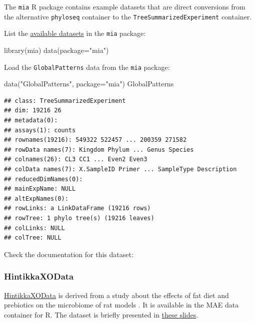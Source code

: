 \documentclass[
]{book}
\newenvironment{Shaded}{\begin{snugshade}}{\end{snugshade}}
\newcommand{\AttributeTok}[1]{\textcolor[rgb]{0.77,0.63,0.00}{#1}}
\newcommand{\FunctionTok}[1]{\textcolor[rgb]{0.00,0.00,0.00}{#1}}
\newcommand{\NormalTok}[1]{#1}
\newcommand{\StringTok}[1]{\textcolor[rgb]{0.31,0.60,0.02}{#1}}
\begin{document}
The \texttt{mia} R package contains example datasets that are direct
conversions from the alternative \texttt{phyloseq} container to the
\texttt{TreeSummarizedExperiment} container.

List the \href{https://microbiome.github.io/mia/reference/index.html}{available
datasets} in
the \texttt{mia} package:

\begin{Shaded}
\begin{Highlighting}[]
\FunctionTok{library}\NormalTok{(mia)}
\FunctionTok{data}\NormalTok{(}\AttributeTok{package=}\StringTok{"mia"}\NormalTok{)}
\end{Highlighting}
\end{Shaded}

Load the \texttt{GlobalPatterns} data from the \texttt{mia} package:

\begin{Shaded}
\begin{Highlighting}[]
\FunctionTok{data}\NormalTok{(}\StringTok{"GlobalPatterns"}\NormalTok{, }\AttributeTok{package=}\StringTok{"mia"}\NormalTok{)}
\NormalTok{GlobalPatterns}
\end{Highlighting}
\end{Shaded}

\begin{verbatim}
## class: TreeSummarizedExperiment 
## dim: 19216 26 
## metadata(0):
## assays(1): counts
## rownames(19216): 549322 522457 ... 200359 271582
## rowData names(7): Kingdom Phylum ... Genus Species
## colnames(26): CL3 CC1 ... Even2 Even3
## colData names(7): X.SampleID Primer ... SampleType Description
## reducedDimNames(0):
## mainExpName: NULL
## altExpNames(0):
## rowLinks: a LinkDataFrame (19216 rows)
## rowTree: 1 phylo tree(s) (19216 leaves)
## colLinks: NULL
## colTree: NULL
\end{verbatim}

Check the documentation for this dataset:

\hypertarget{hintikka-desc}{%
\subsubsection{HintikkaXOData}\label{hintikka-desc}}

\href{https://microbiome.github.io/microbiomeDataSets/reference/HintikkaXOData.html}{HintikkaXOData}
is derived from a study about the effects of fat diet and prebiotics on the
microbiome of rat models \citep{Hintikka2021}. It is available in the MAE data
container for R. The dataset is briefly presented in
\href{https://microbiome.github.io/outreach/hintikkaxo_presentation.html}{these slides}.
\end{document}
